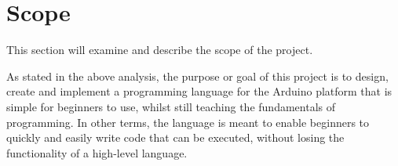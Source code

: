 \section{Scope}
This section will examine and describe the scope of the project. %

As stated in the above analysis, the purpose or goal of this project is to design, create and implement a
programming language for the Arduino platform that is simple for beginners to use, whilst still teaching the
fundamentals of programming.
In other terms, the language is meant to enable beginners to quickly and easily write
code that can be executed, without losing the functionality of a high-level language.
 